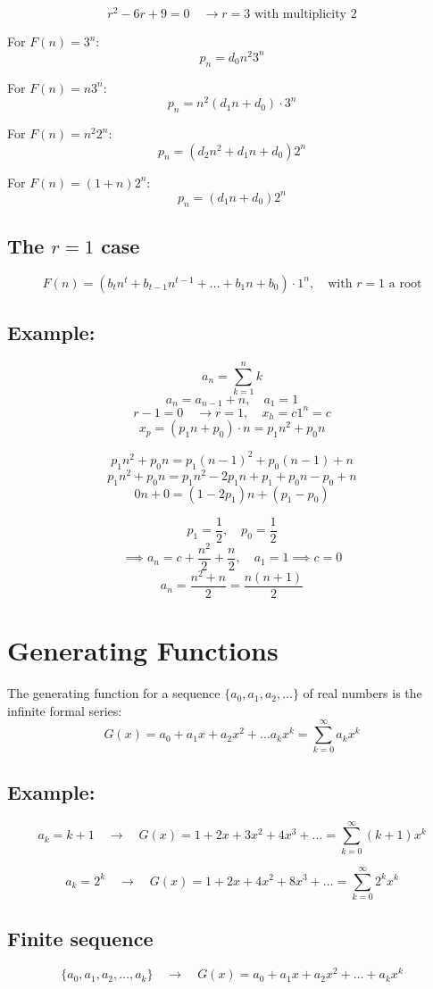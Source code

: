 \documentclass[11pt]{article}
\begin{document}
\[
r^2 - 6r + 9 = 0 \quad \rightarrow r = 3 \text{ with multiplicity } 2
\]

For $F(n) = 3^n$:
\[
p_n = d_0 n^2 3^n
\]

For $F(n) = n 3^n$:
\[
p_n = n^2 (d_1 n + d_0) \cdot 3^n
\]

For $F(n) = n^2 2^n$:
\[
p_n = (d_2 n^2 + d_1 n + d_0) 2^n
\]

For $F(n) = (1 + n) 2^n$:
\[
p_n = (d_1 n + d_0) 2^n
\]

\subsection{The $r = 1$ case}
\[
F(n) = (b_t n^t + b_{t-1} n^{t-1} + \dots + b_1 n + b_0) \cdot 1^n, \quad \text{with } r = 1 \text{ a root}
\]

\subsection*{Example:}
\[
a_n = \sum_{k = 1}^{n} k
\]
\[
a_n = a_{n-1} + n, \quad a_1 = 1
\]
\[
r - 1 = 0 \quad \rightarrow r = 1, \quad x_h = c 1^n = c
\]
\[
x_p = (p_1 n + p_0) \cdot n = p_1 n^2 + p_0 n
\]

\[
p_1 n^2 + p_0 n = p_1 (n-1)^2 + p_0 (n-1) + n
\]
\[
p_1 n^2 + p_0 n = p_1 n^2 - 2 p_1 n + p_1 + p_0 n - p_0 + n
\]
\[
0n + 0 = (1 - 2p_1) n + (p_1 - p_0)
\]

\[
p_1 = \frac{1}{2}, \quad p_0 = \frac{1}{2}
\]
\[
\implies a_n = c + \frac{n^2}{2} + \frac{n}{2}, \quad a_1 = 1 \implies c = 0
\]
\[
a_n = \frac{n^2 + n}{2} = \frac{n(n+1)}{2}
\]

\section{Generating Functions}
The generating function for a sequence $\{a_0, a_1, a_2, \dots\}$ of real numbers is the infinite formal series:
\[
G(x) = a_0 + a_1 x + a_2 x^2 + \dots a_k x^k = \sum_{k=0}^{\infty} a_k x^k
\]

\subsection*{Example:}
\[
a_k = k + 1 \quad \rightarrow \quad G(x) = 1 + 2x + 3x^2 + 4x^3 + \dots = \sum_{k=0}^{\infty} (k+1) x^k
\]

\[
a_k = 2^k \quad \rightarrow \quad G(x) = 1 + 2x + 4x^2 + 8x^3 + \dots = \sum_{k=0}^{\infty} 2^k x^k
\]

\subsection{Finite sequence}
\[
\{a_0, a_1, a_2, \dots, a_k\} \quad \rightarrow \quad G(x) = a_0 + a_1 x + a_2 x^2 + \dots + a_k x^k
\]
\end{document}
